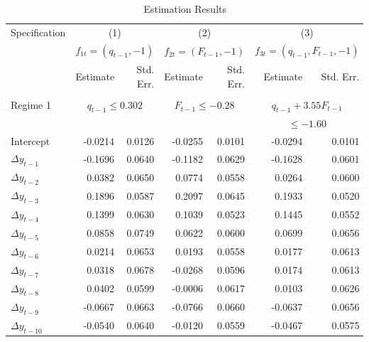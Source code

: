 \documentclass[12pt, reqno]{amsart}
\begin{document}
\begin{table}[htp]
\caption{Estimation Results}
\begin{center}
\begin{tabular}{lrrrrrr}
\hline\hline
Specification     & \multicolumn{2}{c}{(1)} & \multicolumn{2}{c}{(2)} & \multicolumn{2}{c}{(3)} \vspace*{1ex} \\ 
    & \multicolumn{2}{c}{$f_{1t} = (q_{t-1}, -1)$} & \multicolumn{2}{c}{$f_{2t} = (F_{t-1}, -1)$} & \multicolumn{2}{c}{$f_{3t} = (q_{t-1}, F_{t-1}, -1)$} \vspace*{1ex} \\ 
                  &   Estimate & Std. Err. &   Estimate & Std. Err.  &   Estimate & Std. Err. \\ 
\hline
\\
Regime 1          & \multicolumn{2}{c}{$q_{t-1} \leq 0.302$} & \multicolumn{2}{c}{$F_{t-1} \leq -0.28$} & \multicolumn{2}{c}{$q_{t-1} + 3.55 F_{t-1}$} \\
        &  & & & & \multicolumn{2}{c}{$\leq -1.60$} \vspace*{1ex} \\
Intercept         &  -0.0214   &  0.0126 & -0.0255  &  0.0101 &   -0.0294   &   0.0101   \\
$\Delta y_{t-1}$  &  -0.1696   &  0.0640 & -0.1182  &  0.0629 &   -0.1628   &   0.0601   \\
$\Delta y_{t-2}$  &   0.0382   &  0.0650 &  0.0774  &  0.0558 &    0.0264   &   0.0600   \\
$\Delta y_{t-3}$  &   0.1896   &  0.0587 &  0.2097  &  0.0645 &    0.1933   &   0.0520   \\
$\Delta y_{t-4}$  &   0.1399   &  0.0630 &  0.1039  &  0.0523 &    0.1445   &   0.0552   \\
$\Delta y_{t-5}$  &   0.0858   &  0.0749 &  0.0622  &  0.0600 &    0.0699   &   0.0656   \\
$\Delta y_{t-6}$  &   0.0214   &  0.0653 &  0.0193  &  0.0558 &    0.0177   &   0.0613   \\
$\Delta y_{t-7}$  &   0.0318   &  0.0678 & -0.0268  &  0.0596 &    0.0174   &   0.0613   \\
$\Delta y_{t-8}$  &   0.0402   &  0.0599 & -0.0006  &  0.0617 &    0.0103   &   0.0626   \\
$\Delta y_{t-9}$  &  -0.0667   &  0.0663 & -0.0766  &  0.0660 &   -0.0637   &   0.0656   \\
$\Delta y_{t-10}$ &  -0.0540   &  0.0640 & -0.0120  &  0.0559 &   -0.0467   &   0.0575   \\

\end{tabular}
\end{center}
\end{table}
\end{document}
